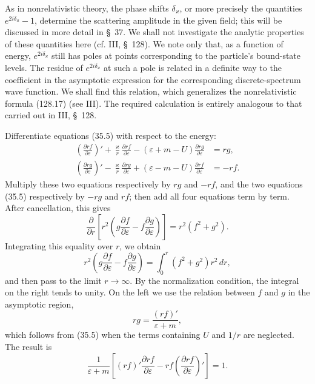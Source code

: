As in nonrelativistic theory, the phase shifts $\delta_\varkappa$, or more precisely the quantities $e^{2i\delta_\varkappa}-1$, determine the scattering amplitude in the given field; this will be discussed in more detail in \S~37. We shall not investigate the analytic properties of these quantities here (cf. III, \S~128). We note only that, as a function of energy, $e^{2i\delta_\varkappa}$ still has poles at points corresponding to the particle's bound-state levels. The residue of $e^{2i\delta_\varkappa}$ at such a pole is related in a definite way to the coefficient in the asymptotic expression for the corresponding discrete-spectrum wave function. We shall find this relation, which generalizes the nonrelativistic formula (128.17) (see III). The required calculation is entirely analogous to that carried out in III, \S~128.

Differentiate equations (35.5) with respect to the energy:
\[
\begin{aligned}
\left(\frac{\partial rf}{\partial\varepsilon}\right)'
+\frac\varkappa r\frac{\partial rf}{\partial\varepsilon}
-(\varepsilon+m-U)\frac{\partial rg}{\partial\varepsilon}&=rg,\\
\left(\frac{\partial rg}{\partial\varepsilon}\right)'
-\frac\varkappa r\frac{\partial rg}{\partial\varepsilon}
+(\varepsilon-m-U)\frac{\partial rf}{\partial\varepsilon}&=-rf.
\end{aligned}
\]
Multiply these two equations respectively by $rg$ and $-rf$, and the two equations (35.5) respectively by $-rg$ and $rf$; then add all four equations term by term. After cancellation, this gives
\[
\frac\partial{\partial r}\left[r^2\left(g\frac{\partial f}{\partial\varepsilon}
-f\frac{\partial g}{\partial\varepsilon}\right)\right]
=r^2(f^2+g^2).
\]
Integrating this equality over $r$, we obtain
\[
r^2\left(g\frac{\partial f}{\partial\varepsilon}
-f\frac{\partial g}{\partial\varepsilon}\right)
=\int_0^r(f^2+g^2)r^2\,dr,
\]
and then pass to the limit $r\to\infty$. By the normalization condition, the integral on the right tends to unity. On the left we use the relation between $f$ and $g$ in the asymptotic region,
\[
rg=\frac{(rf)'}{\varepsilon+m},
\]
which follows from (35.5) when the terms containing $U$ and $1/r$ are neglected. The result is
\begin{equation}
\frac1{\varepsilon+m}\left[(rf)'\frac{\partial rf}{\partial\varepsilon}
-rf\left(\frac{\partial rf}{\partial\varepsilon}\right)'\right]=1.
\tag{35.10}
\end{equation}

